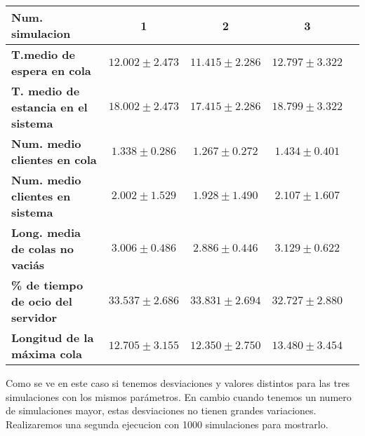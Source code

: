 \documentclass[]{article}
\begin{document}
\begin{table}[H]
	\begin{center}
		\begin{tabularx}{1\textwidth}{|X|c|c|c|c|}
			\hline
			\textbf{Num. simulacion} &  1 & 2 & 3\\
			\hline \hline
			\textbf{T.medio de espera en cola}& $12.002\pm2.473$ & $11.415\pm2.286$ & $12.797\pm3.322$ \\ \hline
			\textbf{T. medio de estancia en el sistema}& $18.002\pm2.473$ & $17.415\pm2.286$ & $18.799\pm3.322$ \\ \hline
			\textbf{Num. medio clientes en cola}& $1.338\pm0.286$ & $1.267\pm0.272$& $1.434\pm0.401$ \\  \hline
			\textbf{Num. medio clientes en sistema}& $2.002\pm1.529$ & $1.928\pm1.490$& $2.107\pm1.607$ \\ \hline
			\textbf{Long. media de colas no vaciás}& $3.006\pm0.486$ & $2.886\pm0.446$& $3.129\pm0.622$ \\ \hline
			\textbf{\% de tiempo de ocio del servidor}& $33.537\pm2.686$ & $33.831\pm2.694$ & $32.727\pm2.880$ \\ \hline
			\textbf{Longitud de la máxima cola}& $12.705\pm3.155$  &$12.350\pm2.750$& $13.480\pm3.454$ \\ \hline
		\end{tabularx}
		
	\end{center}
\end{table}

Como se ve en este caso si tenemos desviaciones y valores distintos para las tres simulaciones con los mismos parámetros. En cambio cuando tenemos un numero de simulaciones mayor, estas desviaciones no tienen grandes variaciones. Realizaremos una segunda ejecucion con 1000 simulaciones para mostrarlo.
\end{document}
